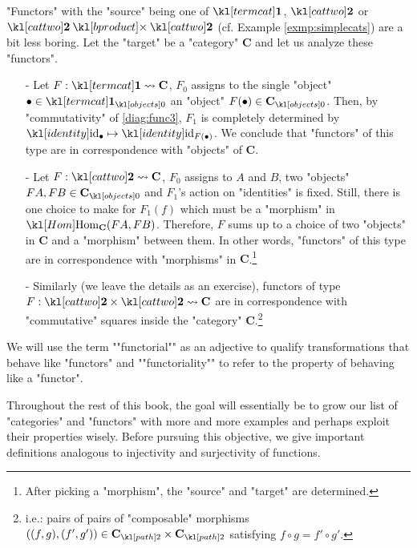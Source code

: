 \documentclass[main.tex]{subfiles}
\begin{document}
\begin{exmps}\label{exmp:simplediagrams}
    "Functors" with the "source" being one of $\termcat$, $\cattwo$ or $\cattwo \product \cattwo$ (cf. Example \ref{exmp:simplecats}) are a bit less boring. Let the "target" be a "category" $\mathbf{C}$ and let us analyze these "functors".
    \begin{itemize}
        \item[-] Let $F: \termcat \rightsquigarrow \mathbf{C}$, $F_0$ assigns to the single "object" $\bullet \in \obj{\termcat}$ an "object" $F(\bullet) \in \obj{\mathbf{C}}$. Then, by "commutativity" of \eqref{diag:func3}, $F_1$ is completely determined by $\id_{\bullet} \mapsto \id_{F(\bullet)}$. We conclude that "functors" of this type are in correspondence with "objects" of $\mathbf{C}$.
        
        \item[-] Let $F: \cattwo \rightsquigarrow \mathbf{C}$, $F_0$ assigns to $A$ and $B$, two "objects" $FA, FB \in\obj{\mathbf{C}}$ and $F_1$'s action on "identities" is fixed. Still, there is one choice to make for $F_1(f)$ which must be a "morphism" in $\Hom_{\mathbf{C}}(FA, FB)$. Therefore, $F$ sums up to a choice of two "objects" in $\mathbf{C}$ and a "morphism" between them. In other words, "functors" of this type are in correspondence with "morphisms" in $\mathbf{C}$.\footnote{After picking a "morphism", the "source" and "target" are determined.}
        
        \item[-] Similarly (we leave the details as an exercise), functors of type $F: \cattwo\times \cattwo \rightsquigarrow \mathbf{C}$ are in correspondence with "commutative" squares inside the "category" $\mathbf{C}$.\footnote{i.e.: pairs of pairs of "composable" morphisms $((f,g), (f',g')) \in \mortwo{\mathbf{C}} \times \mortwo{\mathbf{C}}$ satisfying $f \circ g = f' \circ g'$.}
    \end{itemize}
\end{exmps}
\begin{rem}[Functoriality]
	\AP We will use the term ""functorial"" as an adjective to qualify transformations that behave like "functors" and ""functoriality"" to refer to the property of behaving like a "functor".
\end{rem}
Throughout the rest of this book, the goal will essentially be to grow our list of "categories" and "functors" with more and more examples and perhaps exploit their properties wisely. Before pursuing this objective, we give important definitions analogous to injectivity and surjectivity of functions.
\end{document}
